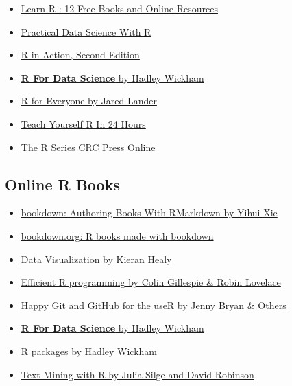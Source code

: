 \documentclass[]{book}
\providecommand{\tightlist}{%
  \setlength{\itemsep}{0pt}\setlength{\parskip}{0pt}}
\theoremstyle{definition}
\theoremstyle{definition}
\theoremstyle{definition}
\theoremstyle{remark}
\begin{document}
\begin{itemize}
\tightlist
\item
  \href{http://ucanalytics.com/blogs/learn-r-12-books-and-online-resources/}{Learn
  R : 12 Free Books and Online Resources}
\item
  \href{https://www.manning.com/books/practical-data-science-with-r}{Practical
  Data Science With R}
\item
  \href{https://www.manning.com/books/r-in-action-second-edition?a_bid=5c2b1e1d\&a_aid=RiA2ed}{R
  in Action, Second Edition}
\item
  \href{https://www.amazon.com/R-Data-Science-Hadley-Wickham/dp/1491910399/ref=as_li_ss_tl?ie=UTF8\&qid=1469550189\&sr=8-1\&keywords=R+for+data+science\&linkCode=sl1\&tag=devtools-20\&linkId=6fe0069f9605cf847ed96c191f4e84dd}{\textbf{R
  For Data Science} by Hadley Wickham}
\item
  \href{https://www.jaredlander.com/r-for-everyone/}{R for Everyone by
  Jared Lander}
\item
  \href{https://www.informit.com/store/r-in-24-hours-sams-teach-yourself-9780672338489}{Teach
  Yourself R In 24 Hours}
\item
  \href{https://www.crcpress.com/Chapman--HallCRC-The-R-Series/book-series/CRCTHERSER}{The
  R Series \textbar{} CRC Press Online}
\end{itemize}

\hypertarget{online-r-books}{%
\subsection{Online R Books}\label{online-r-books}}

\begin{itemize}
\tightlist
\item
  \href{https://bookdown.org/yihui/bookdown/}{bookdown: Authoring Books
  With RMarkdown by Yihui Xie}
\item
  \href{https://bookdown.org/}{bookdown.org: R books made with bookdown}
\item
  \href{http://socviz.co/index.html}{Data Visualization by Kieran Healy}
\item
  \href{https://csgillespie.github.io/efficientR/}{Efficient R
  programming by Colin Gillespie \& Robin Lovelace}
\item
  \href{http://happygitwithr.com/}{Happy Git and GitHub for the useR by
  Jenny Bryan \& Others}
\item
  \href{http://r4ds.had.co.nz/}{\textbf{R For Data Science} by Hadley
  Wickham}
\item
  \href{http://r-pkgs.had.co.nz/}{R packages by Hadley Wickham}
\item
  \href{https://www.tidytextmining.com/}{Text Mining with R by Julia
  Silge and David Robinson}
\end{itemize}
\end{document}
